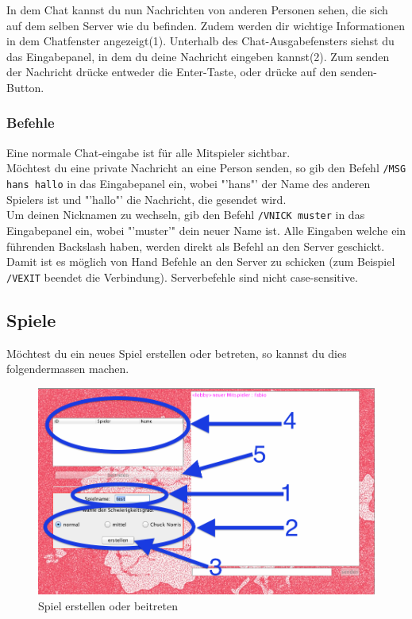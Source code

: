 \documentclass[ngerman, 12pt, pdftex]{scrartcl}[2006/07/30]
\begin{document}
In dem Chat kannst du nun Nachrichten von anderen Personen sehen, die sich auf dem selben Server wie du befinden. Zudem werden dir wichtige Informationen in dem Chatfenster angezeigt(1).
Unterhalb des Chat-Ausgabefensters siehst du das Eingabepanel, in dem du deine Nachricht eingeben kannst(2). Zum senden der Nachricht dr\"{u}cke entweder die Enter-Taste, oder dr\"{u}cke auf den senden-Button.
\subsubsection{Befehle}
Eine normale Chat-eingabe ist f\"{u}r alle Mitspieler sichtbar. \\
M\"{o}chtest du eine private Nachricht an eine Person senden, so gib den Befehl \lstinline{/MSG hans hallo} in das Eingabepanel ein, wobei "'hans"' der Name des anderen Spielers ist und "'hallo"' die Nachricht, die gesendet wird. \\
Um deinen Nicknamen zu wechseln, gib den Befehl \lstinline{/VNICK muster} in das Eingabepanel ein, wobei "'muster'" dein neuer Name ist.
Alle Eingaben welche ein führenden Backslash haben, werden direkt als Befehl an den Server geschickt. Damit ist es möglich von Hand Befehle an den Server zu schicken (zum Beispiel \lstinline{/VEXIT} beendet die Verbindung). Serverbefehle sind nicht case-sensitive.

\newpage

\subsection{Spiele}
M\"{o}chtest du ein neues Spiel erstellen oder betreten, so kannst du dies folgendermassen machen.

\begin{figure}[h]
\centering
\includegraphics[scale=0.3]{lobby/spiel_erstellen.png}
\caption{Spiel erstellen oder beitreten}
\end{figure}
\end{document}
